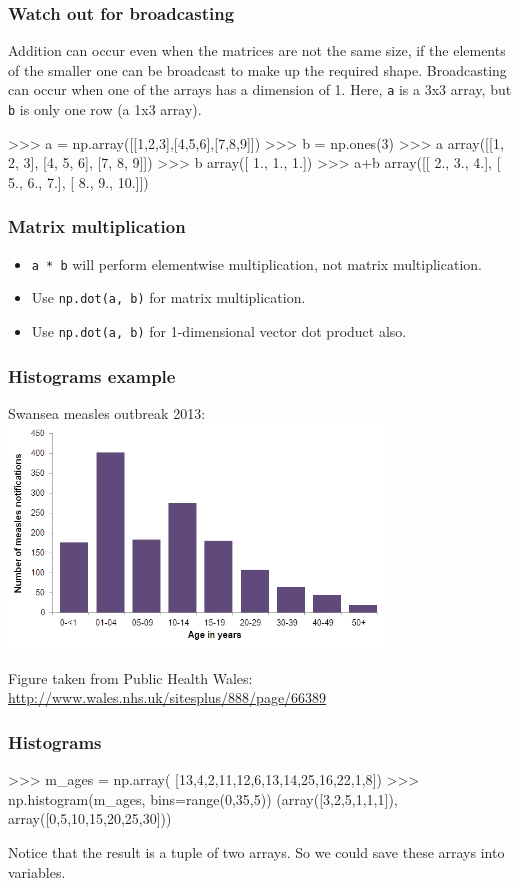\documentclass{beamer}
\begin{document}
\begin{frame}[fragile]
\frametitle{Watch out for broadcasting}
Addition can occur even when the matrices are not the same size, if the 
elements of the smaller one can be broadcast to make up the required shape. Broadcasting can occur when one of the arrays has a dimension of 1.
Here, \texttt{a} is a 3x3 array, but \texttt{b} is only one row (a 1x3 array).
\begin{code}
>>> a = np.array([[1,2,3],[4,5,6],[7,8,9]])
>>> b = np.ones(3)
>>> a
array([[1, 2, 3],
       [4, 5, 6],
       [7, 8, 9]])
>>> b
array([ 1.,  1.,  1.])
>>> a+b
array([[  2.,   3.,   4.],
       [  5.,   6.,   7.],
       [  8.,   9.,  10.]])
\end{code}
\end{frame}


\begin{frame}[fragile]
\frametitle{Matrix multiplication}
\begin{itemize}
\item \texttt{a * b} will perform elementwise multiplication, not matrix multiplication. 
\item Use \texttt{np.dot(a, b)} for matrix multiplication. 
\item Use \texttt{np.dot(a, b)} for 1-dimensional vector dot product also.
\end{itemize}
\end{frame}



\begin{frame}[fragile]
\frametitle{Histograms example}
Swansea measles outbreak 2013:
\includegraphics[width=10cm]{measlesbyage01072013.jpg}

Figure taken from Public Health Wales: \url{http://www.wales.nhs.uk/sitesplus/888/page/66389}
\end{frame}


\begin{frame}[fragile]
\frametitle{Histograms}
\begin{code}
>>> m_ages = np.array(
      [13,4,2,11,12,6,13,14,25,16,22,1,8])
>>> np.histogram(m_ages, bins=range(0,35,5))
(array([3,2,5,1,1,1]), array([0,5,10,15,20,25,30]))
\end{code}

Notice that the result is a tuple of two arrays. So we could save these arrays into variables.
\end{frame}
\end{document}
